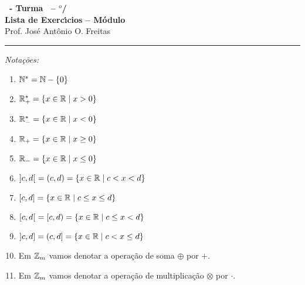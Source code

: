 \documentclass[12pt]{exam}
\begin{document}
    \begin{center}
    {\Large\bf \disciplina\ - Turma \turma\ -- \semestre$^{o}$/\ano} \\ \vspace{9pt} {\large\bf
        Lista de Exerc{\'\i}cios -- Módulo \numeromodulo}\\ \vspace{9pt} Prof. Jos{\'e} Ant{\^o}nio O. Freitas
    \end{center}
    \hrule
    \begin{center}
        \textit{Nota\c{c}\~oes:}
    \end{center}
    \begin{multicols}{2}
        \begin{enumerate}[label={\roman*})]
            \item $\mathbb{N}^* = \mathbb{N} - \{0\}$

            \item $\mathbb{R}^*_+ = \{x \in \mathbb{R} \mid x > 0\}$

            \item $\mathbb{R}^*_- = \{x \in \mathbb{R} \mid x < 0\}$

            \item $\mathbb{R}_+ = \{x \in \mathbb{R} \mid x \ge 0\}$

            \item $\mathbb{R}_- = \{x \in \mathbb{R} \mid x \le 0\}$

            \item $]c,d[\ = (c,d) = \{x \in \mathbb{R} \mid c < x < d\}$

            \item $[c,d] = \{x \in \mathbb{R} \mid c \le x \le d\}$

            \item $[c,d[\ = [c, d) = \{x \in \mathbb{R} \mid c \le x < d\}$

            \item $]c,d] = (c, d] = \{x \in \mathbb{R} \mid c < x \le d\}$

            \item Em $\mathbb{Z}_m$ vamos denotar a opera\c{c}\~ao de soma $\oplus$ por $+$.

            \item Em $\mathbb{Z}_m$ vamos denotar a opera\c{c}\~ao de multiplica\c{c}\~ao $\otimes$ por $\cdot$.

        \end{enumerate}
    \end{multicols}

    \vspace{.6cm}
\end{document}
